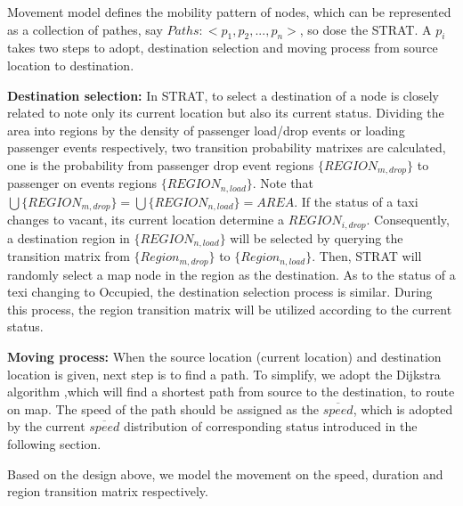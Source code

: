 
Movement model defines the mobility pattern of nodes, which can be represented as a collection of pathes, say $Paths:<p_1,p_2,...,p_n>$, so dose the STRAT. A $p_i$ takes two steps to adopt, destination selection and moving process from source location to destination.

\textbf{Destination selection:} In STRAT, to select a destination of a node is closely related to note only its current location but also its current status. Dividing the area into regions by the density of passenger load/drop events or loading passenger events respectively, two transition probability matrixes are calculated, one is the probability from passenger drop event regions $\{REGION_{m,drop}\}$ to passenger on events regions $\{REGION_{n,load}\}$. Note that $\bigcup\{REGION_{m,drop}\}=\bigcup\{REGION_{n,load}\}=AREA$. If the status of a taxi changes to vacant, its current location determine a $REGION_{i,drop}$. Consequently, a destination region in $\{REGION_{n,load}\}$ will be selected by querying the transition matrix from $\{Region_{m,drop}\}$ to $\{Region_{n,load}\}$. Then, STRAT will randomly select a map node in the region as the destination. As to the status of a texi changing to Occupied, the destination selection process is similar. During this process, the region transition matrix will be utilized according to the current status.

\textbf{Moving process:} When the source location (current location) and destination location is given, next step is to find a path. To simplify, we adopt the Dijkstra algorithm ,which will find a shortest path from source to the destination, to route on map. The speed of the path should be assigned as the $\overline{speed}$, which is adopted by the current $\overline{speed}$  distribution of corresponding status introduced in the following section.

Based on the design above, we model the movement on the speed, duration and region transition matrix respectively.



